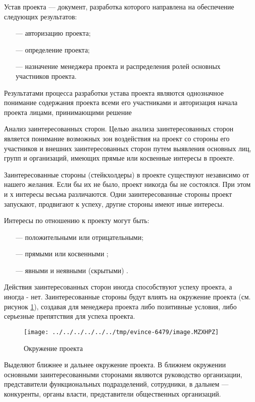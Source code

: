 Устав проекта --- документ, разработка которого направлена на обеспечение следующих результатов:
\begin{itemize}
	\item [---]авторизацию проекта;
\item [---]определение проекта;
\item [---]назначение менеджера проекта и распределения ролей основных участников проекта.
\end{itemize}

Результатами процесса разработки устава проекта являются однознач­ное понимание содержания проекта всеми его участниками и автори­зация начала проекта лицами, принимающими решение \cite[135--137]{polkovnikov}

Анализ заинтересованных сторон.
Целью анализа заинтересованных сторон является понимание возмож­ных зон воздействия на проект со стороны его участников и внешних заинтересованных сторон путем выявления основных лиц, групп и организаций, имеющих прямые или косвенные интересы в проекте.

Заинтересованные стороны (стейкхолдеры) в проекте существуют независимо от нашего желания.
Если бы их не было, проект никогда бы не состоялся.
При этом и х интересы весьма различаются.
Одни заинтересованные стороны проект запускают, продвигают к успеху, другие стороны имеют иные интересы.

Интересы по отношению к проекту могут быть:
\begin{itemize}
	\item [---]положительными или отрицательными;
	\item [---]прямыми или косвенными ;
	\item [---]явными и неявными (скрытыми) .
\end{itemize}

Действия заинтересованных сторон иногда способствуют успеху проекта, а иногда - нет.
Заинтересованные стороны будут влиять на окружение проекта (см. рисунок \ref{fig:okuzhenie}), создавая для менеджера проекта либо позитивные условия, либо серьезные препятствия для успеха проекта.

\begin{figure}[h]
	\centering
	\texttt{[image: ../../../../../../tmp/evince-6479/image.MZXHPZ]}
	\caption{Окружение проекта}
	\label{fig:okuzhenie}
\end{figure}

Выделяют ближнее и дальнее окружение проекта.
В ближнем окружении основными заинтересованными сторонами являются руко­водство организации, представители функциональных подразделений,
сотрудники, в дальнем --- конкуренты, органы власти, представители общественных организаций.

